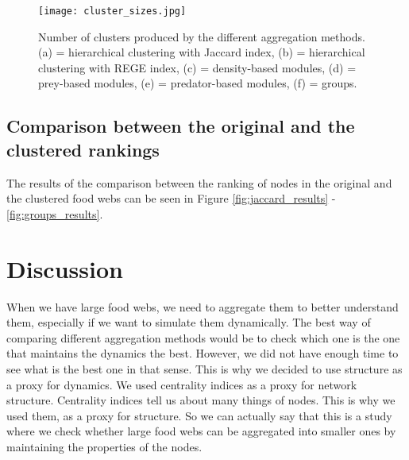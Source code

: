 \documentclass[twocolumn]{article}
\begin{document}
						\begin{figure}[htbp]%
								\centering
								\texttt{[image: cluster\_sizes.jpg]}
								\caption{Number of clusters produced by the different aggregation methods. (a) = hierarchical clustering with Jaccard index, (b) = hierarchical clustering with REGE index, (c) = density-based modules, (d) = prey-based modules, (e) = predator-based modules, (f) = groups.}
								\label{fig:cluster_sizes}
							\end{figure}


	\subsection*{Comparison between the original and the clustered rankings}

	The results of the comparison between the ranking of nodes in the original and the clustered food webs can be seen in Figure \ref{fig:jaccard_results} - \ref{fig:groups_results}.

\section*{Discussion}

	When we have large food webs, we need to aggregate them to better understand them, especially if we want to simulate them dynamically. The best way of comparing different aggregation methods would be to check which one is the one that maintains the dynamics the best. However, we did not have enough time to see what is the best one in that sense. This is why we decided to use structure as a proxy for dynamics. We used centrality indices as a proxy for network structure. Centrality indices tell us about many things of nodes. This is why we used them, as a proxy for structure. So we can actually say that this is a study where we check whether large food webs can be aggregated into smaller ones by maintaining the properties of the nodes.
\end{document}
